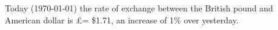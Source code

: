 \documentclass{article}
\begin{document}
Today (\today) the rate of exchange between the British
pound and American dollar is \pounds = \$1.71, an
increase of 1\% over yesterday.
\end{document}
